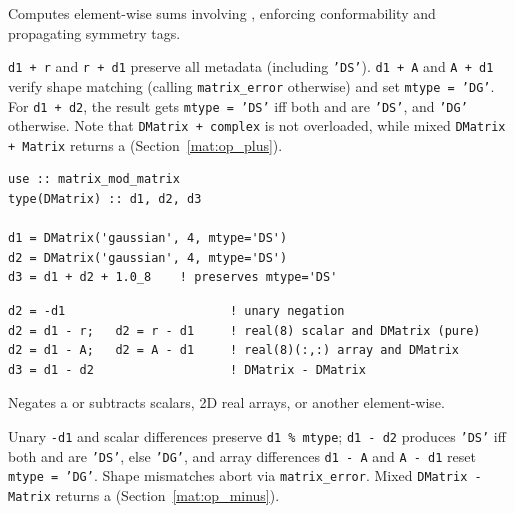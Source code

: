Computes element-wise sums involving , enforcing conformability and propagating symmetry tags.

\texttt{d1 + r} and \texttt{r + d1} preserve all metadata (including \texttt{'DS'}). \texttt{d1 + A} and \texttt{A + d1} verify shape matching (calling \texttt{matrix\_error} otherwise) and set \texttt{mtype = 'DG'}. For \texttt{d1 + d2}, the result gets \texttt{mtype = 'DS'} iff both  and  are \texttt{'DS'}, and \texttt{'DG'} otherwise. Note that \texttt{DMatrix + complex} is not overloaded, while mixed \texttt{DMatrix + Matrix} returns a  (Section~\ref{mat:op_plus}).

\begin{description}[leftmargin=2.2cm, style=nextline]
\end{description}

\lstset{language=[95]Fortran}
\begin{lstlisting}
use :: matrix_mod_matrix
type(DMatrix) :: d1, d2, d3

d1 = DMatrix('gaussian', 4, mtype='DS')
d2 = DMatrix('gaussian', 4, mtype='DS')
d3 = d1 + d2 + 1.0_8    ! preserves mtype='DS'
\end{lstlisting}


\lstset{language=[95]Fortran}
\begin{lstlisting}
d2 = -d1                       ! unary negation
d2 = d1 - r;   d2 = r - d1     ! real(8) scalar and DMatrix (pure)
d2 = d1 - A;   d2 = A - d1     ! real(8)(:,:) array and DMatrix
d3 = d1 - d2                   ! DMatrix - DMatrix
\end{lstlisting}

Negates a  or subtracts scalars, 2D real arrays, or another  element-wise.

Unary \texttt{-d1} and scalar differences preserve \texttt{d1 \% mtype}; \texttt{d1 - d2} produces \texttt{'DS'} iff both  and  are \texttt{'DS'}, else \texttt{'DG'}, and array differences \texttt{d1 - A} and \texttt{A - d1} reset \texttt{mtype = 'DG'}. Shape mismatches abort via \texttt{matrix\_error}. Mixed \texttt{DMatrix - Matrix} returns a  (Section~\ref{mat:op_minus}).

